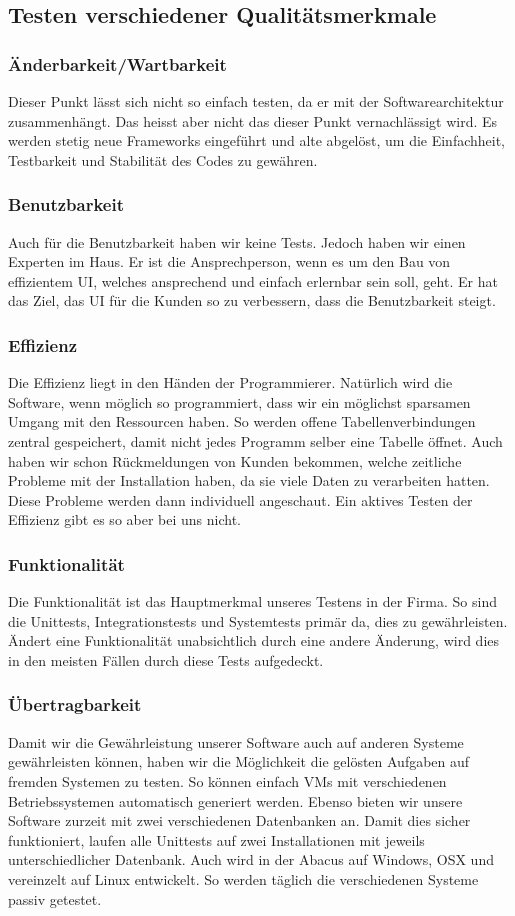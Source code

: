 \subsection{Testen verschiedener Qualitätsmerkmale}
\subsubsection{Änderbarkeit/Wartbarkeit} 
Dieser Punkt lässt sich nicht so einfach testen, da er mit der Softwarearchitektur zusammenhängt. Das heisst aber nicht das dieser Punkt vernachlässigt wird. Es werden stetig neue Frameworks eingeführt und alte abgelöst, um die Einfachheit, Testbarkeit und Stabilität des Codes zu gewähren.
\subsubsection{Benutzbarkeit} 
Auch für die Benutzbarkeit haben wir keine Tests. Jedoch haben wir einen Experten im Haus. Er ist die Ansprechperson, wenn es um den Bau von effizientem UI, welches ansprechend und einfach erlernbar sein soll, geht. Er hat das Ziel, das UI für die Kunden so zu verbessern, dass die Benutzbarkeit steigt.
\subsubsection{Effizienz}
Die Effizienz liegt in den Händen der Programmierer. Natürlich wird die Software, wenn möglich so programmiert, dass wir ein möglichst sparsamen Umgang mit den Ressourcen haben. So werden offene Tabellenverbindungen zentral gespeichert, damit nicht jedes Programm selber eine Tabelle öffnet. Auch haben wir schon Rückmeldungen von Kunden bekommen, welche zeitliche Probleme mit der Installation haben, da sie viele Daten zu verarbeiten hatten. Diese Probleme werden dann individuell angeschaut. Ein aktives Testen der Effizienz gibt es so aber bei uns nicht.
\subsubsection{Funktionalität} 
Die Funktionalität ist das Hauptmerkmal unseres Testens in der Firma. So sind die Unittests, Integrationstests und Systemtests primär da, dies zu gewährleisten. Ändert eine Funktionalität unabsichtlich durch eine andere Änderung, wird dies in den meisten Fällen durch diese Tests aufgedeckt.
\subsubsection{Übertragbarkeit} 
Damit wir die Gewährleistung unserer Software auch auf anderen Systeme gewährleisten können, haben wir die Möglichkeit die gelösten Aufgaben auf fremden Systemen zu testen. So können einfach VMs mit verschiedenen Betriebssystemen automatisch generiert werden. Ebenso bieten wir unsere Software zurzeit mit zwei verschiedenen Datenbanken an. Damit dies sicher funktioniert, laufen alle Unittests auf zwei Installationen mit jeweils unterschiedlicher Datenbank. Auch wird in der Abacus auf Windows, OSX und vereinzelt auf Linux entwickelt. So werden täglich die verschiedenen Systeme passiv getestet.
